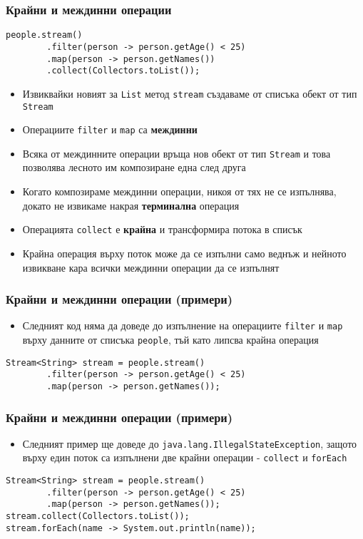\documentclass[ignorenonframetext, hyperref=unicode,compress,pdflatex]{beamer}
\begin{document}
\begin{frame}[containsverbatim]\frametitle{Крайни и междинни операции}
\begin{lstlisting}
people.stream()
		.filter(person -> person.getAge() < 25)
		.map(person -> person.getNames())
		.collect(Collectors.toList());
\end{lstlisting}
\begin{itemize}
  \item Извиквайки новият за \lstinline{List} метод \lstinline{stream} създаваме
  от списъка обект от тип \lstinline{Stream}
  \item Операциите \lstinline{filter} и \lstinline{map} са \textbf{междинни}
  \item Всяка от междинните операции връща нов обект от тип \lstinline{Stream} и
  това позволява лесното им композиране една след друга
  \item Когато композираме междинни операции, никоя от тях не се изпълнява,
  докато не извикаме накрая \textbf{терминална} операция
  \item Операцията \lstinline{collect} е \textbf{крайна} и трансформира потока в
  списък
  \item Крайна операция върху поток може да се изпълни само веднъж и нейното
  извикване кара всички междинни операции да се изпълнят
\end{itemize}
\end{frame}

\begin{frame}[containsverbatim]\frametitle{Крайни и междинни операции (примери)}
\begin{itemize}
  \item Следният код няма да доведе до изпълнение на операциите
  \lstinline{filter} и \lstinline{map} върху данните от списъка
  \lstinline{people}, тъй като липсва крайна операция
\end{itemize}
\begin{lstlisting}
Stream<String> stream = people.stream()
		.filter(person -> person.getAge() < 25)
		.map(person -> person.getNames());
\end{lstlisting}
\end{frame}

\begin{frame}[containsverbatim]\frametitle{Крайни и междинни операции (примери)}
\begin{itemize}
  \item Следният пример ще доведе до
  \lstinline{java.lang.IllegalStateException}, защото върху един поток са
  изпълнени две крайни операции - \lstinline{collect} и \lstinline{forEach}
\end{itemize}
\begin{lstlisting}
Stream<String> stream = people.stream()
		.filter(person -> person.getAge() < 25)
		.map(person -> person.getNames());
stream.collect(Collectors.toList());
stream.forEach(name -> System.out.println(name));\end{lstlisting}
\end{frame}
\end{document}

